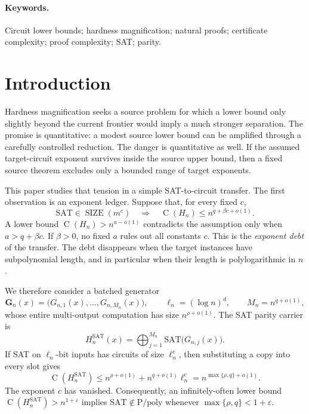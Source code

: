 \documentclass[11pt]{article}
\theoremstyle{definition}
\newcommand{\SIZE}{\operatorname{SIZE}}
\newcommand{\Ckt}{\operatorname{C}}
\newcommand{\SAT}{\mathrm{SAT}}
\newcommand{\Ppoly}{\mathrm{P/poly}}
\newcommand{\eps}{\varepsilon}
\newcommand{\Mn}{M_n}
\newcommand{\Gn}{\mathbf{G}_n}
\begin{document}
\paragraph{Keywords.}
Circuit lower bounds; hardness magnification; natural proofs; certificate complexity; proof complexity; SAT; parity.

\section{Introduction}

Hardness magnification seeks a source problem for which a lower bound only slightly beyond the current frontier would imply a much stronger separation. The promise is quantitative: a modest source lower bound can be amplified through a carefully controlled reduction. The danger is quantitative as well. If the assumed target-circuit exponent survives inside the source upper bound, then a fixed source theorem excludes only a bounded range of target exponents.

This paper studies that tension in a simple SAT-to-circuit transfer. The first observation is an exponent ledger. Suppose that, for every fixed $c$,
\begin{equation}\label{eq:intro-ledger}
  \SAT\in\SIZE(m^c)
  \quad\Longrightarrow\quad
  \Ckt(H_n)\le n^{q+\beta c+o(1)}.
\end{equation}
A lower bound $\Ckt(H_n)>n^{a-o(1)}$ contradicts the assumption only when $a>q+\beta c$. If $\beta>0$, no fixed $a$ rules out all constants $c$. This is the \emph{exponent debt} of the transfer. The debt disappears when the target instances have subpolynomial length, and in particular when their length is polylogarithmic in $n$.

We therefore consider a batched generator
\[
  \Gn(x)=\bigl(G_{n,1}(x),\ldots,G_{n,\Mn}(x)\bigr),
  \qquad
  \ell_n=(\log n)^d,
  \qquad
  M_n=n^{q+o(1)},
\]
whose entire multi-output computation has size $n^{\rho+o(1)}$. The SAT parity carrier is
\begin{equation}\label{eq:intro-carrier}
  H_n^{\SAT}(x)
  =\bigoplus_{j=1}^{M_n}\SAT\bigl(G_{n,j}(x)\bigr).
\end{equation}
If SAT on $\ell_n$-bit inputs has circuits of size $\ell_n^c$, then substituting a copy into every slot gives
\[
  \Ckt(H_n^{\SAT})
  \le n^{\rho+o(1)}+n^{q+o(1)}\ell_n^c
  =n^{\max\{\rho,q\}+o(1)}.
\]
The exponent $c$ has vanished. Consequently, an infinitely-often lower bound $\Ckt(H_n^{\SAT})>n^{1+\eps}$ implies $\SAT\notin\Ppoly$ whenever $\max\{\rho,q\}<1+\eps$.
\end{document}
